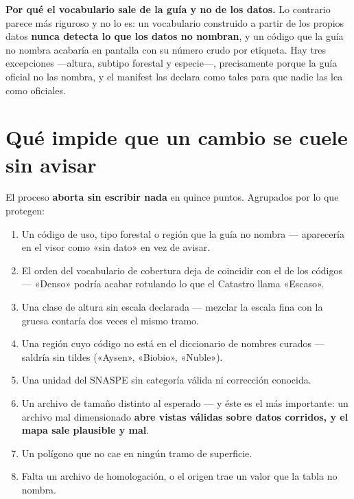 \documentclass[11pt,a4paper]{report}
\newcommand{\campo}[1]{\textcolor{conaf}{\textbf{#1}}}
\begin{document}
\begin{nota}
\campo{Por qué el vocabulario sale de la guía y no de los datos.} Lo contrario
parece más riguroso y no lo es: un vocabulario construido a partir de los
propios datos \campo{nunca detecta lo que los datos no nombran}, y un código que
la guía no nombra acabaría en pantalla con su número crudo por etiqueta. Hay
tres excepciones —altura, subtipo forestal y especie—, precisamente porque la
guía oficial no las nombra, y el manifest las declara como tales para que nadie
las lea como oficiales.
\end{nota}

\chapter{Qué impide que un cambio se cuele sin avisar}

El proceso \campo{aborta sin escribir nada} en quince puntos. Agrupados por lo
que protegen:

\begin{enumerate}[itemsep=2pt]
  \item Un código de uso, tipo forestal o región que la guía no nombra —
        aparecería en el visor como «sin dato» en vez de avisar.
  \item El orden del vocabulario de cobertura deja de coincidir con el de los
        códigos — «Denso» podría acabar rotulando lo que el Catastro llama
        «Escaso».
  \item Una clase de altura sin escala declarada — mezclar la escala fina con la
        gruesa contaría dos veces el mismo tramo.
  \item Una región cuyo código no está en el diccionario de nombres curados —
        saldría sin tildes («Aysen», «Biobio», «Nuble»).
  \item Una unidad del SNASPE sin categoría válida ni corrección conocida.
  \item Un archivo de tamaño distinto al esperado — y éste es el más importante:
        un archivo mal dimensionado \campo{abre vistas válidas sobre datos
        corridos, y el mapa sale plausible y mal}.
  \item Un polígono que no cae en ningún tramo de superficie.
  \item Falta un archivo de homologación, o el origen trae un valor que la tabla
        no nombra.
\end{enumerate}
\end{document}
